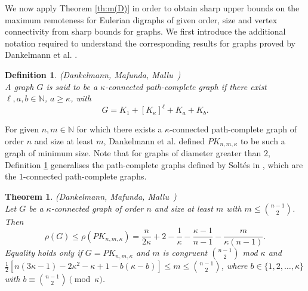 \documentclass[a4paper,11pt]{article}
\newtheorem{theorem}{Theorem}[section]
\newtheorem{definition}{Definition}[section]
\begin{document}

%





We now apply Theorem \ref{th:m(D)} in order to obtain sharp upper bounds on the maximum remoteness for Eulerian digraphs of given order, size and vertex connectivity from sharp bounds for graphs. We first introduce the additional notation required to understand the corresponding results for graphs proved by Dankelmann et al. \cite{DanMafMal2025}. 


\begin{definition} \label{def:kappa-connected-path-complete}
{\rm (Dankelmann, Mafunda, Mallu~\cite{DanMafMal2025})}\\
A graph $G$ is said to be a $\kappa$-connected path-complete graph if there exist
$\ell, a, b \in \mathbb{N}$, $a \geq \kappa$, with  
\[ G = K_1 + [K_{\kappa}]^{\ell} + K_a + K_b.\]
\end{definition}

For given $n,m \in \mathbb{N}$ for which there exists a $\kappa$-connected path-complete graph of order $n$ and size at least $m$, Dankelmann et al. \cite{DanMafMal2025} defined $PK_{n,m,\kappa}$ to be such a graph of minimum size. Note that for graphs of diameter greater than $2$, Definition \ref{def:kappa-connected-path-complete} generalises the path-complete graphs defined by Solt\'{e}s in \cite{Sol1991}, which are the $1$-connected path-complete graphs.

\begin{theorem}\label{theo:remoteness-of-kappa-connected-graphs}
{\rm (Dankelmann, Mafunda, Mallu~\cite{DanMafMal2025})}\\
Let $G$ be a $\kappa$-connected graph of order $n$ and size at least $m$ with $m \leq \binom{n-1}{2}$. Then 
\begin{equation*} 
\rho(G) \leq \rho (PK_{n,m,\kappa})=\frac{n}{2\kappa} +2 - \frac{1}{\kappa} - \frac{\kappa-1}{n-1} - \frac{m}{\kappa(n-1)}.
\end{equation*}
Equality holds only if $G= PK_{n,m,\kappa}$ and $m$ is congruent $\binom{n-1}{2}$ mod $\kappa$ and 
$\frac{1}{2} [ n(3\kappa-1) -2\kappa^2-\kappa+1 - b(\kappa-b) ] 
\leq m
\leq \binom{n-1}{2}$,
where $b \in \{1,2,\ldots,\kappa\}$ 
with $b \equiv \binom{n-1}{2} \pmod{\kappa}$.  
\end{theorem}
\end{document}

